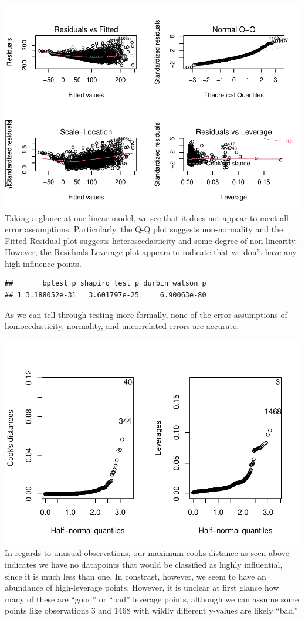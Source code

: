 \documentclass[
]{article}
\begin{document}
\includegraphics{Final_Project_2_files/figure-latex/unnamed-chunk-11-1.pdf}
Taking a glance at our linear model, we see that it does not appear to
meet all error assumptions. Particularly, the Q-Q plot suggests
non-normality and the Fitted-Residual plot suggests heteroscedasticity
and some degree of non-linearity. However, the Residuals-Leverage plot
appears to indicate that we don't have any high influence points.

\begin{verbatim}
##       bptest p shapiro test p durbin watson p
## 1 3.188052e-31   3.601797e-25     6.90063e-80
\end{verbatim}

As we can tell through testing more formally, none of the error
assumptions of homocedasticity, normality, and uncorrelated errors are
accurate.

\includegraphics{Final_Project_2_files/figure-latex/unnamed-chunk-13-1.pdf}
In regards to unusual observations, our maximum cooks distance as seen
above indicates we have no datapoints that would be classified as highly
influential, since it is much less than one. In constrast, however, we
seem to have an abundance of high-leverage points. However, it is
unclear at first glance how many of these are ``good'' or ``bad''
leverage points, although we can assume some points like observations 3
and 1468 with wildly different y-values are likely ``bad.''
\end{document}
